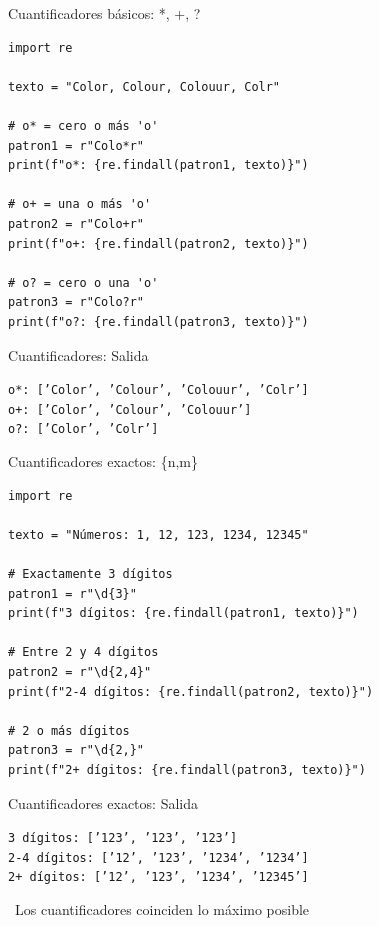 \documentclass{beamer}
\begin{document}
\begin{frame}[fragile]{Cuantificadores básicos: *, +, ? \faAsterisk}
\begin{lstlisting}
import re

texto = "Color, Colour, Colouur, Colr"

# o* = cero o más 'o'
patron1 = r"Colo*r"
print(f"o*: {re.findall(patron1, texto)}")

# o+ = una o más 'o'
patron2 = r"Colo+r"
print(f"o+: {re.findall(patron2, texto)}")

# o? = cero o una 'o'
patron3 = r"Colo?r"
print(f"o?: {re.findall(patron3, texto)}")
\end{lstlisting}
\end{frame}

\begin{frame}[fragile]{Cuantificadores: Salida \faArrowCircleRight}
\begin{tcolorbox}[colback=green!10,colframe=green,title={\small\faArrowCircleRight \ Salida},coltitle=fg0,left=3pt,right=3pt,top=3pt,bottom=3pt,boxsep=2pt]
\small\texttt{o*: ['Color', 'Colour', 'Colouur', 'Colr']\\
o+: ['Color', 'Colour', 'Colouur']\\
o?: ['Color', 'Colr']}
\end{tcolorbox}
\end{frame}

\begin{frame}[fragile]{Cuantificadores exactos: \{n,m\} \faHashtag}
\begin{lstlisting}
import re

texto = "Números: 1, 12, 123, 1234, 12345"

# Exactamente 3 dígitos
patron1 = r"\d{3}"
print(f"3 dígitos: {re.findall(patron1, texto)}")

# Entre 2 y 4 dígitos
patron2 = r"\d{2,4}"
print(f"2-4 dígitos: {re.findall(patron2, texto)}")

# 2 o más dígitos
patron3 = r"\d{2,}"
print(f"2+ dígitos: {re.findall(patron3, texto)}")
\end{lstlisting}
\end{frame}

\begin{frame}[fragile]{Cuantificadores exactos: Salida \faArrowCircleRight}
\begin{tcolorbox}[colback=green!10,colframe=green,title={\small\faArrowCircleRight \ Salida},coltitle=fg0,left=3pt,right=3pt,top=3pt,bottom=3pt,boxsep=2pt]
\small\texttt{3 dígitos: ['123', '123', '123']\\
2-4 dígitos: ['12', '123', '1234', '1234']\\
2+ dígitos: ['12', '123', '1234', '12345']}
\end{tcolorbox}

\vspace{0.3cm}
\begin{notebox}
\small\faInfoCircle\ Los cuantificadores coinciden lo máximo posible
\end{notebox}
\end{frame}
\end{document}
